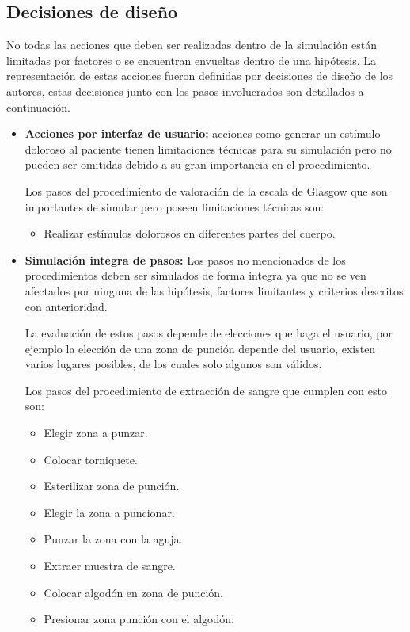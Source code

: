 \subsection{Decisiones de diseño}

No todas las acciones que deben ser realizadas dentro de la simulación están 
limitadas por factores o se encuentran envueltas dentro de una hipótesis. La 
representación de estas acciones fueron definidas por decisiones de diseño 
de los autores, estas decisiones junto con los pasos involucrados son detallados 
a continuación.

\begin{itemize}

\item \textbf{Acciones por interfaz de usuario:} acciones como generar un
    estímulo doloroso al paciente tienen limitaciones técnicas para su
    simulación pero no pueden ser omitidas debido a su gran importancia en el
    procedimiento.
 
    Los pasos del procedimiento de valoración de la escala de Glasgow que son
    importantes de simular pero poseen limitaciones técnicas son:
    \begin{itemize} 
    \item Realizar estímulos dolorosos en diferentes partes del cuerpo. 
    \end{itemize}
    
\item \textbf{Simulación integra de pasos:} Los pasos no mencionados de los procedimientos  
deben ser simulados de forma integra ya que no se ven afectados por 
ninguna de las hipótesis, factores limitantes y criterios descritos con anterioridad.

La evaluación de estos pasos depende de elecciones que haga el usuario, por ejemplo
la elección de una zona de punción depende del usuario, existen varios lugares posibles, 
de los cuales solo algunos son válidos. 

Los pasos del procedimiento de extracción de sangre que cumplen con esto son:
\begin{itemize}
    \item Elegir zona a punzar.
    \item Colocar torniquete.
    \item Esterilizar zona de punción.
    \item Elegir la zona a puncionar.
    \item Punzar la zona con la aguja.
    \item Extraer muestra de sangre.
    \item Colocar algodón en zona de punción.
    \item Presionar zona punción con el algodón.
\end{itemize}


\end{itemize}
